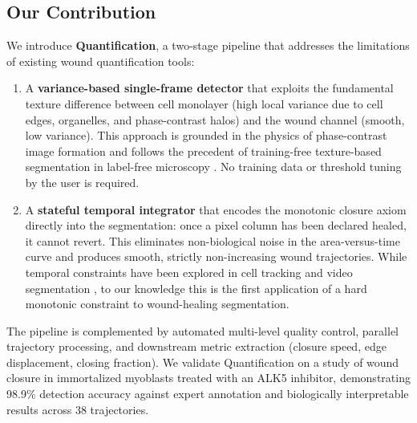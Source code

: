 \subsection{Our Contribution}

We introduce \textbf{Quantification}, a two-stage pipeline that addresses the limitations of existing wound quantification tools:

\begin{enumerate}
  \item A \textbf{variance-based single-frame detector} that exploits the fundamental texture difference between cell monolayer (high local variance due to cell edges, organelles, and phase-contrast halos) and the wound channel (smooth, low variance). This approach is grounded in the physics of phase-contrast image formation \citep{Yin2012} and follows the precedent of training-free texture-based segmentation in label-free microscopy \citep{Ambrossio2022,Vicar2019}. No training data or threshold tuning by the user is required.

  \item A \textbf{stateful temporal integrator} that encodes the monotonic closure axiom directly into the segmentation: once a pixel column has been declared healed, it cannot revert. This eliminates non-biological noise in the area-versus-time curve and produces smooth, strictly non-increasing wound trajectories. While temporal constraints have been explored in cell tracking \citep{Bragantini2025,Lee2023,Li2008} and video segmentation \citep{Guan2021}, to our knowledge this is the first application of a hard monotonic constraint to wound-healing segmentation.
\end{enumerate}

The pipeline is complemented by automated multi-level quality control, parallel trajectory processing, and downstream metric extraction (closure speed, edge displacement, closing fraction). We validate Quantification on a study of wound closure in immortalized myoblasts treated with an ALK5 inhibitor, demonstrating 98.9\% detection accuracy against expert annotation and biologically interpretable results across 38 trajectories.
